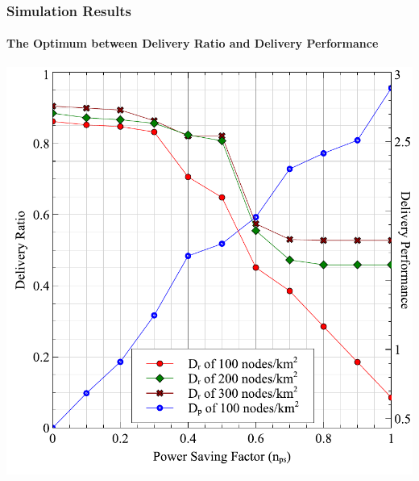 \documentclass{beamer}
\begin{document}
\begin{frame}
	\frametitle{Simulation Results}
	\framesubtitle{The Optimum between Delivery Ratio and Delivery Performance}
	\begin{center}
		\includegraphics[height=0.75\textheight]{Graphs/NpsDeliveryPerformanceAndDeliveryRatio.pdf}
	\end{center}
\end{frame}

\end{document}
